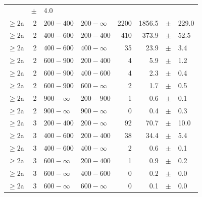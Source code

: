 \begin{table}[!h]
\begin{tabular}{rrllrrcl}
		&$\pm$&    4.0 \\
		$\geq 2${a}\T & 2 & $ 200- 400$ & $200-\infty$ &   2200 &   1856.5 
		&$\pm$&  229.0 \\
		$\geq 2${a}\T & 2 & $ 400- 600$ & $200-400$ &    410 &    373.9 
		&$\pm$&   52.5 \\
		$\geq 2${a} & 2 & $ 400- 600$ & $400-\infty$ &     35 &     23.9 
		&$\pm$&    3.4 \\
		$\geq 2${a}\T & 2 & $ 600- 900$ & $200-400$ &      4 &      5.9 
		&$\pm$&    1.2 \\
		$\geq 2${a} & 2 & $ 600- 900$ & $400-600$ &      4 &      2.3 
		&$\pm$&    0.4 \\
		$\geq 2${a} & 2 & $ 600- 900$ & $600-\infty$ &      2 &      1.7 
		&$\pm$&    0.5 \\
		$\geq 2${a}\T & 2 & $ 900- \infty$ & $200-900$ &      1 &      0.6 
		&$\pm$&    0.1 \\
		$\geq 2${a} & 2 & $ 900- \infty$ & $900-\infty$ &      0 &      0.4 
		&$\pm$&    0.3 \\
		$\geq 2${a}\T & 3 & $ 200- 400$ & $200-\infty$ &     92 &     70.7 
		&$\pm$&   10.0 \\
		$\geq 2${a}\T & 3 & $ 400- 600$ & $200-400$ &     38 &     34.4 
		&$\pm$&    5.4 \\
		$\geq 2${a} & 3 & $ 400- 600$ & $400-\infty$ &      2 &      0.6 
		&$\pm$&    0.1 \\
		$\geq 2${a}\T & 3 & $ 600- \infty$ & $200-400$ &      1 &      0.9 
		&$\pm$&    0.2 \\
		$\geq 2${a} & 3 & $ 600- \infty$ & $400-600$ &      0 &      0.2 
		&$\pm$&    0.0 \\
		$\geq 2${a} & 3 & $ 600- \infty$ & $600-\infty$ &      0 &      0.1 
		&$\pm$&    0.0 \\
		\hline
	\end{tabular}
\end{table}

